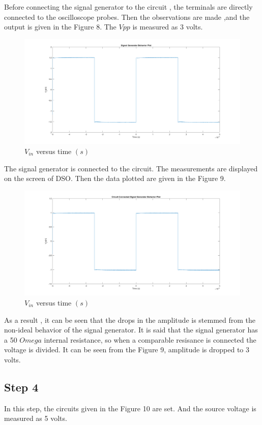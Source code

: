 \documentclass[letterpaper,12pt]{article}
\begin{document}
Before connecting the signal generator to the circuit , the terminals are directly connected to the oscilloscope probes. Then the observations are made ,and the output is given in the Figure 8. The \(V{pp}\) is measured as 3 volts.

\begin{figure}[H]
	\centering
   \includegraphics[width=1\textwidth]{3a.png}
   \caption{\(V_{in}\) versus time \((s)\) }
\end{figure}  

The signal generator is connected to the circuit. The measurements are displayed on the screen of DSO. Then the data  plotted are given in the Figure 9.
\begin{figure}[H]
	\centering
   \includegraphics[width=1\textwidth]{3b.png}
   \caption{\(V_{in}\) versus time \((s)\) }
\end{figure}  
As a result , it can  be seen that the drops in the amplitude is stemmed from the non-ideal behavior of the signal generator. It is said that the signal generator has a 50 \(Omega\)  internal resistance, so when a comparable resisance is connected the voltage is divided. It can be seen from the Figure 9, amplitude is dropped to 3 volts.


\subsection{Step 4}
In this step, the circuits given in the Figure 10 are set. And the source voltage is measured as 5 volts. 
\end{document}
